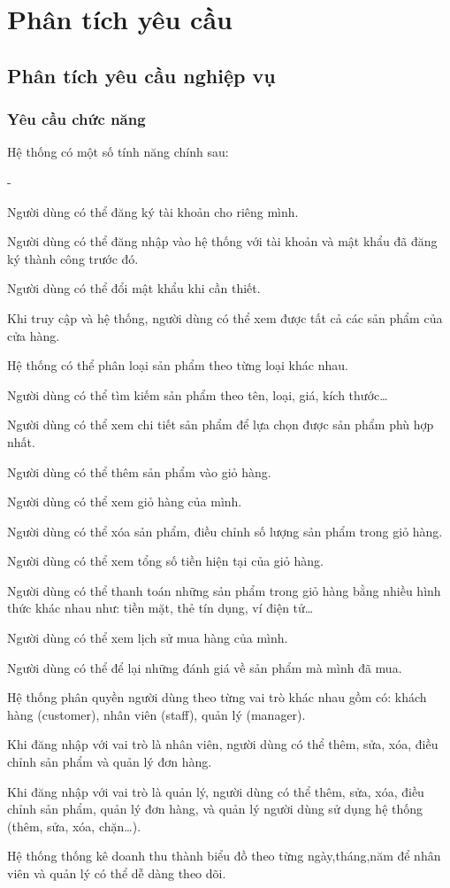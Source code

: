 \chapter{Phân tích yêu cầu}
\section{Phân tích yêu cầu nghiệp vụ}
\subsection{Yêu cầu chức năng}
\noindent Hệ thống có một số tính năng chính sau:
\begin {list} {-}{}
    \item Người dùng có thể đăng ký tài khoản cho riêng mình.
    \item Người dùng có thể đăng nhập vào hệ thống với tài khoản và mật khẩu đã đăng ký thành công trước đó.
    \item Người dùng có thể đổi mật khẩu khi cần thiết.
    \item Khi truy cập và hệ thống, người dùng có thể xem được tất cả các sản phẩm của cửa hàng.
    \item Hệ thống có thể phân loại sản phẩm theo từng loại khác nhau.
    \item Người dùng có thể tìm kiếm sản phẩm theo tên, loại, giá, kích thước\dots
    \item Người dùng có thể xem chi tiết sản phẩm để lựa chọn được sản phẩm phù hợp nhất.
    \item Người dùng có thể thêm sản phẩm vào giỏ hàng.
    \item Người dùng có thể xem giỏ hàng của mình.
    \item Người dùng có thể xóa sản phẩm, điều chỉnh số lượng sản phẩm trong giỏ hàng.
    \item Người dùng có thể xem tổng số tiền hiện tại của giỏ hàng.
    \item Người dùng có thể thanh toán những sản phẩm trong giỏ hàng bằng nhiều hình thức khác nhau như: tiền mặt, thẻ tín dụng, ví điện tử\dots
    \item Người dùng có thể xem lịch sử mua hàng của mình.
    \item Người dùng có thể để lại những đánh giá về sản phẩm mà mình đã mua.
    \item Hệ thống phân quyền người dùng theo từng vai trò khác nhau gồm có: khách hàng (customer), nhân viên (staff), quản lý (manager).
    \item Khi đăng nhập với vai trò là nhân viên, người dùng có thể thêm, sửa, xóa, điều chỉnh sản phẩm và quản lý đơn hàng.
    \item Khi đăng nhập với vai trò là quản lý, người dùng có thể thêm, sửa, xóa, điều chỉnh sản phẩm, quản lý đơn hàng, và quản lý người dùng sử dụng hệ thống (thêm, sửa, xóa, chặn\dots).
    \item Hệ thống thống kê doanh thu thành biểu đồ theo từng ngày,tháng,năm để nhân viên và quản lý có thể dễ dàng theo dõi.
\end {list}
